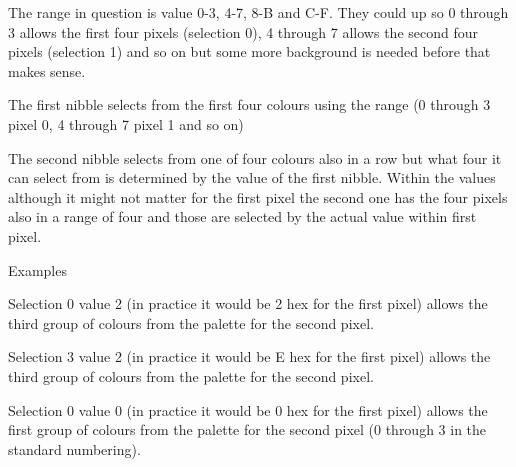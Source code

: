\documentclass[
]{book}
\begin{document}
The range in question is value 0-3, 4-7, 8-B and C-F. They could up so 0 through 3 allows the first four pixels (selection 0), 4 through 7 allows the second four pixels (selection 1) and so on but some more background is needed before that makes sense.

The first nibble selects from the first four colours using the range (0 through 3 pixel 0, 4 through 7 pixel 1 and so on)

The second nibble selects from one of four colours also in a row but what four it can select from is determined by the value of the first nibble. Within the values although it might not matter for the first pixel the second one has the four pixels also in a range of four and those are selected by the actual value within first pixel.

Examples

Selection 0 value 2 (in practice it would be 2 hex for the first pixel) allows the third group of colours from the palette for the second pixel.

Selection 3 value 2 (in practice it would be E hex for the first pixel) allows the third group of colours from the palette for the second pixel.

Selection 0 value 0 (in practice it would be 0 hex for the first pixel) allows the first group of colours from the palette for the second pixel (0 through 3 in the standard numbering).
\end{document}
